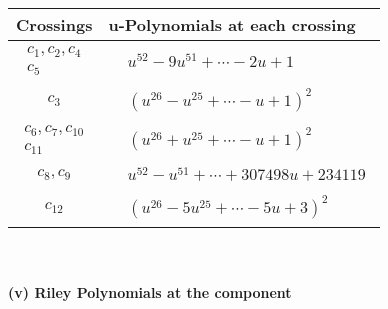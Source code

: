 \documentclass[1p]{elsarticle_modified}
\theoremstyle{definition}
\begin{document}
\begin{tabular}{m{50pt}|m{274pt}}
Crossings & \hspace{64pt}u-Polynomials at each crossing \\
\hline $$\begin{aligned}c_{1},c_{2},c_{4}\\c_{5}\end{aligned}$$&$\begin{aligned}
&u^{52}-9 u^{51}+\cdots-2 u+1
\end{aligned}$\\
\hline $$\begin{aligned}c_{3}\end{aligned}$$&$\begin{aligned}
&(u^{26}- u^{25}+\cdots- u+1)^{2}
\end{aligned}$\\
\hline $$\begin{aligned}c_{6},c_{7},c_{10}\\c_{11}\end{aligned}$$&$\begin{aligned}
&(u^{26}+u^{25}+\cdots- u+1)^{2}
\end{aligned}$\\
\hline $$\begin{aligned}c_{8},c_{9}\end{aligned}$$&$\begin{aligned}
&u^{52}- u^{51}+\cdots+307498 u+234119
\end{aligned}$\\
\hline $$\begin{aligned}c_{12}\end{aligned}$$&$\begin{aligned}
&(u^{26}-5 u^{25}+\cdots-5 u+3)^{2}
\end{aligned}$\\
\hline
\end{tabular}\\~\\
\newpage\renewcommand{\arraystretch}{1}
\flushleft \textbf{(v) Riley Polynomials at the component}\newline \\
\end{document}
